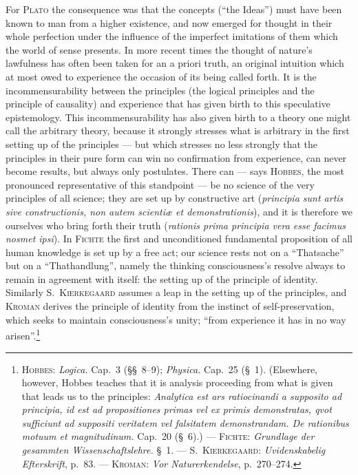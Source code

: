 \documentclass[12pt,a4paper]{book}
\newcommand{\opage}[1]{\marginnote{\footnotesize\textit{[#1]}}}
\begin{document}
For \textsc{Plato} the consequence was that the concepts (``the Ideas'') must
have been known to man from a higher existence, and now emerged for thought in
their whole perfection under the influence of the imperfect imitations of them
which the world of sense presents. In more recent times the thought of nature's
lawfulness has often been taken for an a priori truth, an original intuition
which at most owed to experience the occasion of its being called forth. It is
the incommensurability between the principles (the logical principles and the
principle of causality) and experience that has given birth to this speculative
epistemology. This incommensurability has also given birth to a theory one might
call the arbitrary theory, because it strongly stresses what is arbitrary in the
first setting up of the principles --- but which stresses no less strongly that
the principles in their pure form can win no confirmation from experience, can
never become results, but always only postulates. There can --- says
\textsc{Hobbes}, the most pronounced representative of this standpoint --- \opage{32}be no
science of the very principles of all science; they are set up by constructive
art (\textit{principia sunt artis sive constructionis, non autem scientiæ et
demonstrationis}), and it is therefore we ourselves who bring forth their truth
(\textit{rationis prima principia vera esse facimus nosmet ipsi}). In
\textsc{Fichte} the first and unconditioned fundamental proposition of all human
knowledge is set up by a free act; our science rests not on a ``Thatsache'' but
on a ``Thathandlung'', namely the thinking consciousness's resolve always to
remain in agreement with itself: the setting up of the principle of identity.
Similarly \textsc{S.~Kierkegaard} assumes a leap in the setting up of the
principles, and \textsc{Kroman} derives the principle of identity from the
instinct of self-preservation, which seeks to maintain consciousness's unity;
``from experience it has in no way arisen''.\footnote{\textsc{Hobbes}:
\textit{Logica.} Cap.~3 (§§~8--9); \textit{Physica.} Cap.~25 (§~1). (Elsewhere,
however, Hobbes teaches that it is analysis proceeding from what is given that
leads us to the principles: \textit{Analytica est ars ratiocinandi a supposito
ad principia, id est ad propositiones primas vel ex primis demonstratas, qvot
sufficiunt ad suppositi veritatem vel falsitatem demonstrandam. De rationibus
motuum et magnitudinum.} Cap.~20 (§~6).) --- \textsc{Fichte}: \textit{Grundlage
der gesammten Wissenschaftslehre.} §~1. --- \textsc{S.~Kierkegaard}:
\textit{Uvidenskabelig Efterskrift}, p.~83. --- \textsc{Kroman}: \textit{Vor
Naturerkendelse}, p.~270--274.}
\end{document}
